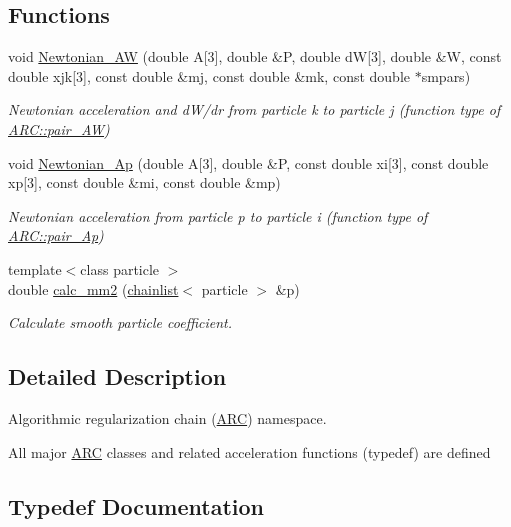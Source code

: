 \subsection*{Functions}
\begin{DoxyCompactItemize}
\item 
void \hyperlink{namespaceARC_a0f1e14e6d00b38d9f98f0eecf523feaa}{Newtonian\+\_\+\+AW} (double A\mbox{[}3\mbox{]}, double \&P, double dW\mbox{[}3\mbox{]}, double \&W, const double xjk\mbox{[}3\mbox{]}, const double \&mj, const double \&mk, const double $\ast$smpars)
\begin{DoxyCompactList}\small\item\em Newtonian acceleration and d\+W/dr from particle k to particle j (function type of \hyperlink{namespaceARC_a5c4308ca4a8d0e0ff59fdce30f00274c}{A\+R\+C\+::pair\+\_\+\+AW}) \end{DoxyCompactList}\item 
void \hyperlink{namespaceARC_a6b8ee871e0832b6b59968ea9069877e0}{Newtonian\+\_\+\+Ap} (double A\mbox{[}3\mbox{]}, double \&P, const double xi\mbox{[}3\mbox{]}, const double xp\mbox{[}3\mbox{]}, const double \&mi, const double \&mp)
\begin{DoxyCompactList}\small\item\em Newtonian acceleration from particle p to particle i (function type of \hyperlink{namespaceARC_a819446c4644b3a3af7ef11574d0b55e0}{A\+R\+C\+::pair\+\_\+\+Ap}) \end{DoxyCompactList}\item 
{\footnotesize template$<$class particle $>$ }\\double \hyperlink{namespaceARC_a8d6c876e9d20067d0e8a5c1c4c2c4be6}{calc\+\_\+mm2} (\hyperlink{classARC_1_1chainlist}{chainlist}$<$ particle $>$ \&p)
\begin{DoxyCompactList}\small\item\em Calculate smooth particle coefficient. \end{DoxyCompactList}\end{DoxyCompactItemize}


\subsection{Detailed Description}
Algorithmic regularization chain (\hyperlink{namespaceARC}{A\+RC}) namespace. 

All major \hyperlink{namespaceARC}{A\+RC} classes and related acceleration functions (typedef) are defined 

\subsection{Typedef Documentation}
\hypertarget{namespaceARC_a819446c4644b3a3af7ef11574d0b55e0}{}\label{namespaceARC_a819446c4644b3a3af7ef11574d0b55e0} 
